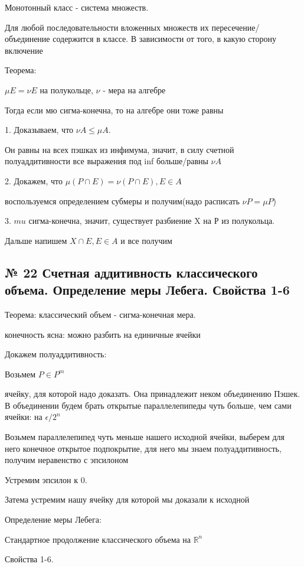 \documentclass{article}
\begin{document}
Монотонный класс - система множеств. 

Для любой последовательности вложенных множеств их пересечение/объединение содержится в классе. В зависимости от того, в какую сторону включение

Теорема:

$\mu E = \nu E$ на полукольце, $\nu$ - мера на алгебре

Тогда если мю сигма-конечна, то на алгебре они тоже равны

1. Доказываем, что $\nu A \leq \mu A$.

Он равны на всех пэшках из инфимума, значит, в силу счетной полуаддитивности все выражения под inf больше/равны $\nu A$

2. Докажем, что $\mu(P \cap E) = \nu (P \cap E), E \in A$

воспользуемся определением субмеры и получим(надо расписать $\nu P = \mu P$)

3. $mu$ сигма-конечна, значит, существует разбиение X на Р из полукольца.

Дальше напишем $X \cap E, E \in A$ и все получим

\subsection{ \footnotesize № 22 Счетная аддитивность классического объема. Определение меры Лебега. Свойства 1-6}

Теорема: классический объем - сигма-конечная мера.

конечность ясна: можно разбить на единичные ячейки

Докажем полуаддитивность:

Возьмем $P \in P^m$

ячейку, для которой надо доказать. Она принадлежит неком объединению Пэшек. В объединении будем брать открытые параллелепипеды чуть больше, чем сами ячейки: на $\epsilon / 2^n$

Возьмем параллелепипед чуть меньше нашего исходной ячейки, выберем для него конечное открытое подпокрытие, для него мы знаем полуаддитивность, получим неравенство с эпсилоном

Устремим эпсилон к 0.

Затема устремим нашу ячейку для которой мы доказали к исходной

Определение меры Лебега:

Стандартное продолжение классического объема на $\mathbb{R}^n$

Свойства 1-6.
\end{document}
